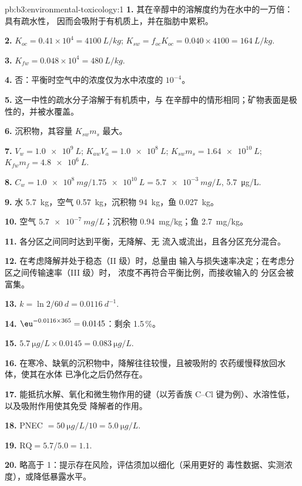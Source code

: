 \begin{solution}{pb:b3:environmental-toxicology:1}
\textbf{1.} 其在辛醇中的溶解度约为在水中的一万倍：具有疏水性，
因而会吸附于有机质上，并在脂肪中累积。

\textbf{2.} $K_{oc} = 0.41 \times 10^4 = \qty{4100}{L/kg}$; $K_{sw} = f_{oc}K_{oc} = 0.040 \times 4100 = \qty{164}{L/kg}$.

\textbf{3.} $K_{fw} = 0.048 \times 10^4 = \qty{480}{L/kg}$.

\textbf{4.} 否：平衡时空气中的浓度仅为水中浓度的 $10^{-4}$。

\textbf{5.} 这一中性的疏水分子溶解于有机质中，与
在辛醇中的情形相同；矿物表面是极性的，并被水覆盖。

\textbf{6.} 沉积物，其容量 $K_{sw}m_s$ 最大。

\textbf{7.} $V_w = \qty{1.0e9}{L}$; $K_{aw}V_a = \qty{1.0e8}{L}$; $K_{sw}m_s = \qty{1.64e10}{L}$; $K_{fw}m_f = \qty{4.8e6}{L}$.

\textbf{8.} $C_w = \qty{1.0e8}{mg}/\qty{1.75e10}{L} = \qty{5.7e-3}{mg/L}$, \qty{5.7}{\micro g/L}.

\textbf{9.} 水 \qty{5.7}{kg}，空气 \qty{0.57}{kg}，沉积物 \qty{94}{kg}，鱼 \qty{0.027}{kg}。

\textbf{10.} 空气 $\qty{5.7e-7}{mg/L}$；沉积物 \qty{0.94}{mg/kg}；鱼 \qty{2.7}{mg/kg}。

\textbf{11.} 各分区之间同时达到平衡，无降解、无
流入或流出，且各分区充分混合。

\textbf{12.} 在考虑降解并处于稳态（II 级）时，总量由
输入与损失速率决定；在考虑分区之间传输速率（III 级）时，
浓度不再符合平衡比例，而接收输入的
分区会被富集。

\textbf{13.} $k = \ln 2/\qty{60}{d} = \qty{0.0116}{d^{-1}}$.

\textbf{14.} $\eu^{-0.0116 \times 365} = 0.0145$：剩余 1.5\,\%。

\textbf{15.} $\qty{5.7}{\micro g/L} \times 0.0145 = \qty{0.083}{\micro g/L}$.

\textbf{16.} 在寒冷、缺氧的沉积物中，降解往往较慢，且被吸附的
农药缓慢释放回水体，使其在水体
已净化之后仍然存在。

\textbf{17.} 能抵抗水解、氧化和微生物作用的键（以芳香族
C--Cl 键为例）、水溶性低，以及吸附作用使其免受
降解者的作用。

\textbf{18.} PNEC $= \qty{50}{\micro g/L}/10 = \qty{5.0}{\micro g/L}$.

\textbf{19.} $\mathrm{RQ} = 5.7/5.0 = 1.1$.

\textbf{20.} 略高于 1：提示存在风险，评估须加以细化（采用更好的
毒性数据、实测浓度），或降低暴露水平。


\end{solution}
